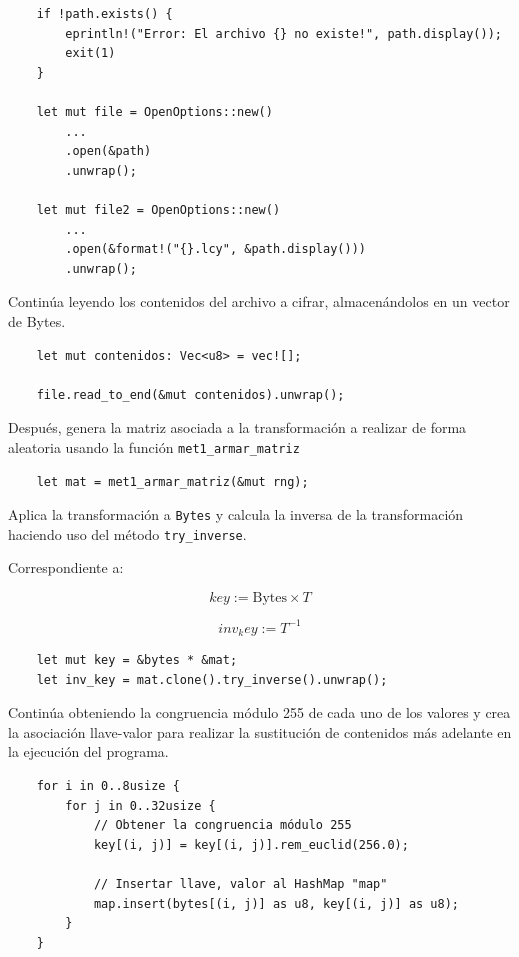 \documentclass[a4paper]{article}
\begin{document}
\begin{verbatim}
    if !path.exists() {
        eprintln!("Error: El archivo {} no existe!", path.display());
        exit(1)
    }

    let mut file = OpenOptions::new()
        ...
        .open(&path)
        .unwrap();

    let mut file2 = OpenOptions::new()
        ...
        .open(&format!("{}.lcy", &path.display()))
        .unwrap();
\end{verbatim}

Continúa leyendo los contenidos del archivo a cifrar, almacenándolos en un
vector de Bytes.

\begin{verbatim}
    let mut contenidos: Vec<u8> = vec![];

    file.read_to_end(&mut contenidos).unwrap();
\end{verbatim}

Después, genera la matriz asociada a la transformación a realizar de forma
aleatoria usando la función \texttt{met1\_armar\_matriz}

\begin{verbatim}
    let mat = met1_armar_matriz(&mut rng);
\end{verbatim}

Aplica la transformación a \texttt{Bytes} y calcula la inversa de la
transformación
haciendo uso del método \texttt{try\_inverse}.

Correspondiente a:

\[
key := \text{Bytes}\times T
\]

\[
inv_key := T^{-1}
\]

\begin{verbatim}
    let mut key = &bytes * &mat;
    let inv_key = mat.clone().try_inverse().unwrap();
\end{verbatim}

Continúa obteniendo la congruencia módulo 255 de cada uno de los valores y crea
la asociación llave-valor para realizar la sustitución de contenidos más
adelante en la ejecución del programa.

\begin{verbatim}
    for i in 0..8usize {
        for j in 0..32usize {
            // Obtener la congruencia módulo 255
            key[(i, j)] = key[(i, j)].rem_euclid(256.0);
            
            // Insertar llave, valor al HashMap "map"
            map.insert(bytes[(i, j)] as u8, key[(i, j)] as u8);
        }
    }
\end{verbatim}
\end{document}

